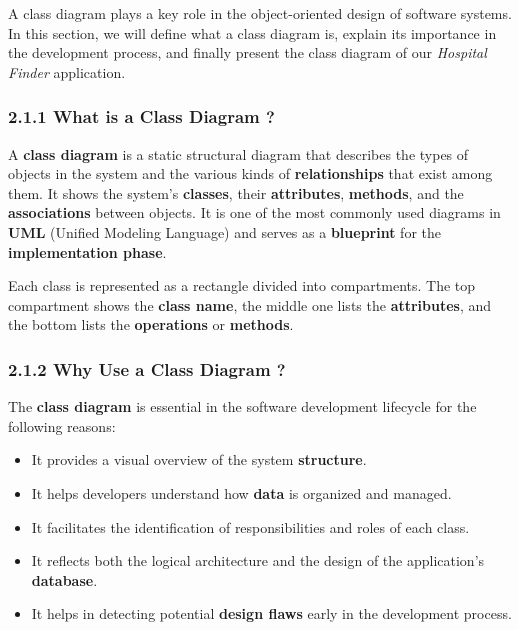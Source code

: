 \documentclass[12pt]{report}
\begin{document}
A class diagram plays a key role in the object-oriented design of software systems. In this section, we will define what a class diagram is, explain its importance in the development process, and finally present the class diagram of our \textit{Hospital Finder} application.

\subsubsection*{2.1.1 What is a Class Diagram ?}
\vspace{0.1cm}

A \textbf{class diagram} is a static structural diagram that describes the types of objects in the system and the various kinds of \textbf{relationships} that exist among them. It shows the system's \textbf{classes}, their \textbf{attributes}, \textbf{methods}, and the \textbf{associations} between objects. It is one of the most commonly used diagrams in \textbf{UML} (Unified Modeling Language) and serves as a \textbf{blueprint} for the \textbf{implementation phase}.

\noindent Each class is represented as a rectangle divided into compartments. The top compartment shows the \textbf{class name}, the middle one lists the \textbf{attributes}, and the bottom lists the \textbf{operations} or \textbf{methods}.


\subsubsection*{2.1.2 Why Use a Class Diagram ?}
\vspace{0.1cm}


The \textbf{class diagram} is essential in the software development lifecycle for the following reasons:

\begin{itemize}
	\item It provides a visual overview of the system \textbf{structure}.
	\item It helps developers understand how \textbf{data} is organized and managed.
	\item It facilitates the identification of responsibilities and roles of each class.
	\item It reflects both the logical architecture and the design of the application's \textbf{database}.
	\item It helps in detecting potential \textbf{design flaws} early in the development process.
\end{itemize}
\end{document}
